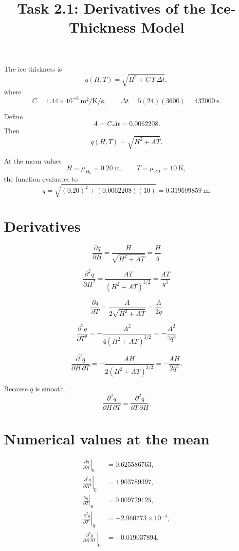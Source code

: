 \documentclass{article}
\title{Task 2.1: Derivatives of the Ice-Thickness Model}
\author{}
\date{}
\begin{document}
\maketitle

The ice thickness is
\[
q(H,T)=\sqrt{H^2+C\,T\,\Delta t},
\]
where
\[
C=1.44\times 10^{-8}\ \si{\meter\squared\per\kelvin\per\second},
\qquad
\Delta t=5(24)(3600)=432000\ \si{\second}.
\]

Define
\[
A=C\Delta t=0.0062208.
\]
Then
\[
q(H,T)=\sqrt{H^2+AT}.
\]

At the mean values
\[
H=\mu_{H_0}=0.20\ \si{\meter},
\qquad
T=\mu_{\Delta T}=10\ \si{\kelvin},
\]
the function evaluates to
\[
q=\sqrt{(0.20)^2+(0.0062208)(10)}
  =0.319699859\ \si{\meter}.
\]

\section*{Derivatives}

\[
\frac{\partial q}{\partial H}
=\frac{H}{\sqrt{H^2+AT}}
=\frac{H}{q}
\]

\[
\frac{\partial^2 q}{\partial H^2}
=\frac{AT}{\left(H^2+AT\right)^{3/2}}
=\frac{AT}{q^3}
\]

\[
\frac{\partial q}{\partial T}
=\frac{A}{2\sqrt{H^2+AT}}
=\frac{A}{2q}
\]

\[
\frac{\partial^2 q}{\partial T^2}
=-\frac{A^2}{4\left(H^2+AT\right)^{3/2}}
=-\frac{A^2}{4q^3}
\]

\[
\frac{\partial^2 q}{\partial H\,\partial T}
=-\frac{AH}{2\left(H^2+AT\right)^{3/2}}
=-\frac{AH}{2q^3}.
\]

Because \(q\) is smooth,
\[
\frac{\partial^2 q}{\partial H\,\partial T}
=\frac{\partial^2 q}{\partial T\,\partial H}.
\]

\section*{Numerical values at the mean}

\[
\boxed{
\begin{aligned}
\left.\frac{\partial q}{\partial H}\right|_0
  &=0.625586763,\\[2mm]
\left.\frac{\partial^2 q}{\partial H^2}\right|_0
  &=1.903789397,\\[2mm]
\left.\frac{\partial q}{\partial T}\right|_0
  &=0.009729125,\\[2mm]
\left.\frac{\partial^2 q}{\partial T^2}\right|_0
  &=-2.960773\times 10^{-4},\\[2mm]
\left.\frac{\partial^2 q}{\partial H\,\partial T}\right|_0
  &=-0.019037894.
\end{aligned}
}
\]
\end{document}
